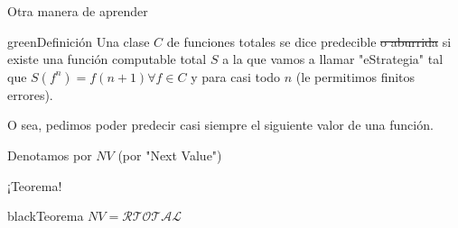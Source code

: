 \documentclass[10pt]{beamer}
\begin{document}






\begin{frame}{Otra manera de aprender}
\begin{mybox}{green}{Definición}
	Una clase $C$ de funciones totales se dice predecible \sout{o aburrida} si existe una función computable total $S$ a la que vamos a llamar "eStrategia" tal que $S(f^n) = f(n+1) \forall f \in C$ y para casi todo $n$ (le permitimos finitos errores).
	
	O sea, pedimos poder predecir casi siempre el siguiente valor de una función.
	
	Denotamos por $NV$ (por "Next Value") 
	\end{mybox}
\end{frame}

\begin{frame}{¡Teorema!}



\begin{mybox}{black}{Teorema}
$NV = \mathcal{RTOTAL}$
\end{mybox}

\end{frame}







\end{document}

